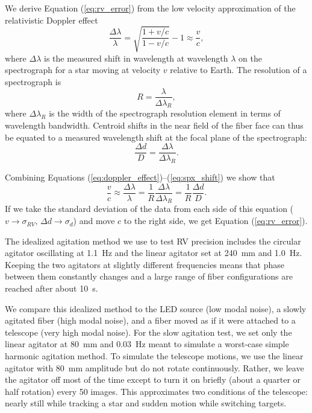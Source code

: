 We derive Equation (\ref{eq:rv_error}) from the low velocity approximation of the relativistic Dop\-pler effect
\begin{equation}
\frac{\Delta \lambda}{\lambda} = \sqrt{\frac{1 + v/c}{1-v/c}} - 1 \approx \frac{v}{c},
\label{eq:doppler_effect}
\end{equation}
where $\Delta \lambda$ is the measured shift in wavelength at wavelength $\lambda$ on the spectrograph for a star moving at velocity $v$ relative to Earth. The resolution of a spectrograph is
\begin{equation}
R = \frac{\lambda}{\Delta \lambda_R},
\label{eq:resolution}
\end{equation}
where $\Delta \lambda_R$ is the width of the spectrograph resolution element in terms of wavelength bandwidth. Centroid shifts in the near field of the fiber face can thus be equated to a measured wavelength shift at the focal plane of the spectrograph:
\begin{equation}
\frac{\Delta d}{D} = \frac{\Delta \lambda}{\Delta \lambda_R}.
\label{eq:spx_shift}
\end{equation}

Combining Equations (\ref{eq:doppler_effect})--(\ref{eq:spx_shift}) we show that
\begin{equation}
\frac{v}{c} \approx \frac{\Delta \lambda}{\lambda} = \frac{1}{R} \frac{\Delta \lambda}{\Delta \lambda_R} = \frac{1}{R} \frac{\Delta d}{D}.
\end{equation}
If we take the standard deviation of the data from each side of this equation ($v \rightarrow \sigma_{RV}$, $\Delta d \rightarrow \sigma_d$) and move $c$ to the right side, we get Equation (\ref{eq:rv_error}).

The idealized agitation method we use to test RV precision includes the circular agitator oscillating at \SI{1.1}{\hertz} and the linear agitator set at \SI{240}{\milli\meter} and \SI{1.0}{\hertz}. Keeping the two agitators at slightly different frequencies means that phase between them constantly changes and a large range of fiber configurations are reached after about \SI{10}{\second}.

We compare this idealized method to the LED source (low modal noise), a slowly agitated fiber (high modal noise), and a fiber moved as if it were attached to a telescope (very high modal noise). For the slow agitation test, we set only the linear agitator at \SI{80}{\milli\meter} and \SI{0.03}{\hertz} meant to simulate a worst-case simple harmonic agitation method. To simulate the telescope motions, we use the linear agitator with \SI{80}{\milli\meter} amplitude but do not rotate continuously. Rather, we leave the agitator off most of the time except to turn it on briefly (about a quarter or half rotation) every 50 images. This approximates two conditions of the telescope: nearly still while tracking a star and sudden motion while switching targets.

